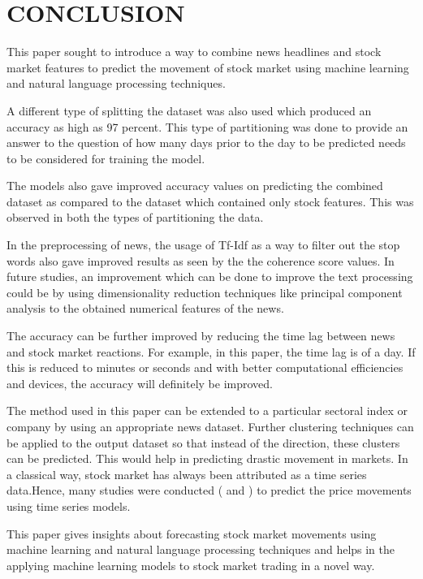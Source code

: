 \documentclass[preprint,12pt]{elsarticle}
\begin{document}
\section{CONCLUSION}
This paper sought to introduce a way to combine news headlines and stock market features to predict the movement of stock market using machine learning and natural language processing techniques.

A different type of splitting the dataset was also used which produced an accuracy as high as 97 percent. This type of partitioning was done to provide an answer to the question of how many days prior to the day to be predicted needs to be considered for training the model.

The models also gave improved accuracy values on predicting the combined dataset as compared to the dataset which contained only stock features. This was observed in both the types of partitioning the data.

In the preprocessing of news, the usage of Tf-Idf as a way to filter out the stop words also gave improved results as seen by the the coherence score values. In future studies, an improvement which can be done to improve the text processing could be by using dimensionality reduction techniques like principal component analysis to the obtained numerical features of the news.

The accuracy can be further improved by reducing the time lag between news and stock market reactions. For example, in this paper, the time lag is of a day. If this is reduced to minutes or seconds and with better computational efficiencies and devices, the accuracy will definitely be improved.

The method used in this paper can be extended to a particular sectoral index or company by using an appropriate news dataset. Further clustering techniques can be applied to the output dataset so that instead of the direction, these clusters can be predicted. This would help in predicting drastic movement in markets. In a classical way, stock market has always been attributed as a time series data.Hence, many studies were conducted (\cite{time_series_1} and \cite{time_series_2}) to predict the price movements using time series models.

This paper gives insights about forecasting stock market movements using machine learning and natural language processing techniques and helps in the applying machine learning models to stock market trading in a novel way.
\end{document}
